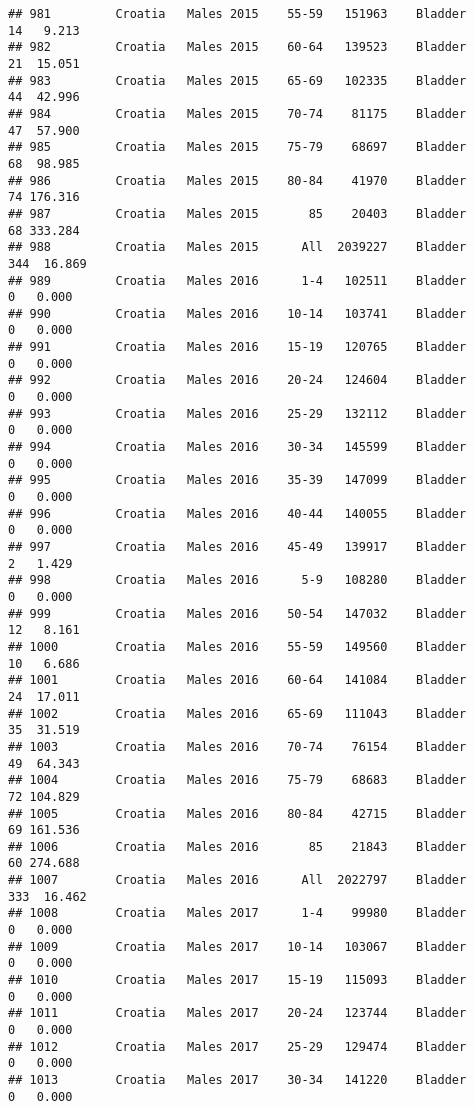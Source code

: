 \documentclass[
]{article}
\begin{document}
\begin{verbatim}
## 981         Croatia   Males 2015    55-59   151963    Bladder     14   9.213
## 982         Croatia   Males 2015    60-64   139523    Bladder     21  15.051
## 983         Croatia   Males 2015    65-69   102335    Bladder     44  42.996
## 984         Croatia   Males 2015    70-74    81175    Bladder     47  57.900
## 985         Croatia   Males 2015    75-79    68697    Bladder     68  98.985
## 986         Croatia   Males 2015    80-84    41970    Bladder     74 176.316
## 987         Croatia   Males 2015       85    20403    Bladder     68 333.284
## 988         Croatia   Males 2015      All  2039227    Bladder    344  16.869
## 989         Croatia   Males 2016      1-4   102511    Bladder      0   0.000
## 990         Croatia   Males 2016    10-14   103741    Bladder      0   0.000
## 991         Croatia   Males 2016    15-19   120765    Bladder      0   0.000
## 992         Croatia   Males 2016    20-24   124604    Bladder      0   0.000
## 993         Croatia   Males 2016    25-29   132112    Bladder      0   0.000
## 994         Croatia   Males 2016    30-34   145599    Bladder      0   0.000
## 995         Croatia   Males 2016    35-39   147099    Bladder      0   0.000
## 996         Croatia   Males 2016    40-44   140055    Bladder      0   0.000
## 997         Croatia   Males 2016    45-49   139917    Bladder      2   1.429
## 998         Croatia   Males 2016      5-9   108280    Bladder      0   0.000
## 999         Croatia   Males 2016    50-54   147032    Bladder     12   8.161
## 1000        Croatia   Males 2016    55-59   149560    Bladder     10   6.686
## 1001        Croatia   Males 2016    60-64   141084    Bladder     24  17.011
## 1002        Croatia   Males 2016    65-69   111043    Bladder     35  31.519
## 1003        Croatia   Males 2016    70-74    76154    Bladder     49  64.343
## 1004        Croatia   Males 2016    75-79    68683    Bladder     72 104.829
## 1005        Croatia   Males 2016    80-84    42715    Bladder     69 161.536
## 1006        Croatia   Males 2016       85    21843    Bladder     60 274.688
## 1007        Croatia   Males 2016      All  2022797    Bladder    333  16.462
## 1008        Croatia   Males 2017      1-4    99980    Bladder      0   0.000
## 1009        Croatia   Males 2017    10-14   103067    Bladder      0   0.000
## 1010        Croatia   Males 2017    15-19   115093    Bladder      0   0.000
## 1011        Croatia   Males 2017    20-24   123744    Bladder      0   0.000
## 1012        Croatia   Males 2017    25-29   129474    Bladder      0   0.000
## 1013        Croatia   Males 2017    30-34   141220    Bladder      0   0.000

\end{verbatim}
\end{document}
